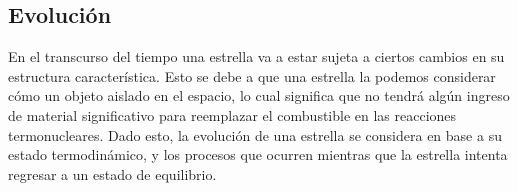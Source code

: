 \subsection{Evolución}

En el transcurso del tiempo una estrella va a estar sujeta a ciertos cambios en
su estructura característica. Esto se debe a que una estrella la podemos
considerar cómo un objeto aislado en el espacio, lo cual significa que no tendrá
algún ingreso de material significativo para reemplazar el combustible
 en las reacciones termonucleares. Dado esto, la evolución de
una estrella se considera en base a su estado termodinámico, y los procesos que
ocurren mientras que la estrella intenta regresar a un estado de equilibrio. 